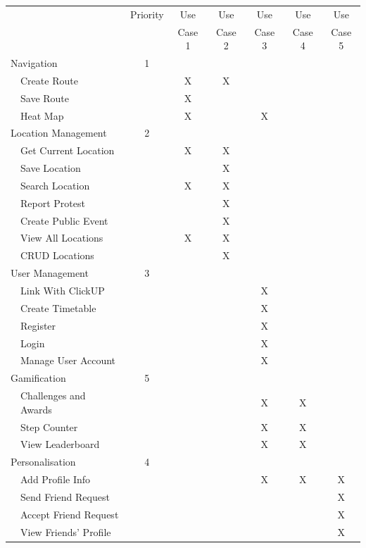 \documentclass[12pt]{article}
\begin{document}
	\begin{table}
	\centering 
	\begin{tabular}{|lc|c|c|c|c|c|c|} %
	\hline
		& & Priority & Use & Use & Use & Use & Use \\
		& & & Case 1 & Case 2 & Case 3 & Case 4 & Case 5 \\
		\hline
			\multicolumn{2}{|l|}{Navigation} & 1 & & & & & \\
			\hline
			 &\multicolumn{1}{l|}{Create Route} & & X & X & & & \\ 
			 & \multicolumn{1}{l|}{Save Route} & & X & & & & \\ 
			 & \multicolumn{1}{l|}{Heat Map} & & X & & X & & \\ 
		\hline
		\multicolumn{2}{|l|}{Location Management} & 2 & & & & & \\ 
		\hline
			& \multicolumn{1}{l|}{Get Current Location} & & X & X & & & \\ 
			& \multicolumn{1}{l|}{Save Location} & & & X & & & \\ 
			& \multicolumn{1}{l|}{Search Location} & & X & X & & & \\ 
			& \multicolumn{1}{l|}{Report Protest} & & & X & & & \\ 
			& \multicolumn{1}{l|}{Create Public Event} & & & X & & & \\ 
			& \multicolumn{1}{l|}{View All Locations} & & X & X & & & \\ 
			& \multicolumn{1}{l|}{CRUD Locations} & & & X & & & \\ 
		\hline
		\multicolumn{2}{|l|}{User Management} & 3 & & & & & \\ \hline
			& \multicolumn{1}{l|}{Link With ClickUP} & & & & X & & \\ 
			& \multicolumn{1}{l|}{Create Timetable} & & & & X & & \\ 
			& \multicolumn{1}{l|}{Register} & & & & X & & \\ 
			& \multicolumn{1}{l|}{Login} & & & & X & & \\
			& \multicolumn{1}{l|}{Manage User Account} & & & & X & & \\ 
			\hline
		\multicolumn{2}{|l|}{Gamifi\-cation} & 5 & & & & & \\ \hline
			& \multicolumn{1}{l|}{Challenges and Awards} & & & & X & X & \\ 
			& \multicolumn{1}{l|}{Step Counter} & & & & X & X & \\ 
			& \multicolumn{1}{l|}{View Leaderboard} & & & & X & X & \\ 
			\hline
		\multicolumn{2}{|l|}{Personalisa\-tion} & 4 & & & & & \\
		\hline 
			& \multicolumn{1}{l|}{Add Profile Info} & & & & X & X & X \\ 
			& \multicolumn{1}{l|}{Send Friend Request} & & & & & & X \\ 
			& \multicolumn{1}{l|}{Accept Friend Request} & & & & & & X \\ 
			& \multicolumn{1}{l|}{View Friends' Profile } & & & & & & X \\ 
		

\end{tabular}
\end{table}
\end{document}
